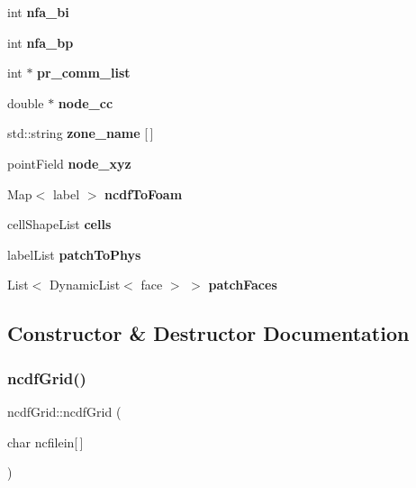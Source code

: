 \begin{DoxyCompactItemize}
int {\bfseries nfa\+\_\+bi}
\item 
\mbox{\label{classncdfGrid_af8c208eb375a16dbb611bfd3844ca87b}} 
int {\bfseries nfa\+\_\+bp}
\item 
\mbox{\label{classncdfGrid_a9969da386f4ce61acaba454946c8a0ed}} 
int $\ast$ {\bfseries pr\+\_\+comm\+\_\+list}
\item 
\mbox{\label{classncdfGrid_ac6123a7753a6bd65acddc55ce69386d5}} 
double $\ast$ {\bfseries node\+\_\+cc}
\item 
\mbox{\label{classncdfGrid_a20801c105799b394bb87c254700ed1ac}} 
std\+::string {\bfseries zone\+\_\+name} \mbox{[}$\,$\mbox{]}
\item 
\mbox{\label{classncdfGrid_ad86c7fc276892d574c33a711a1847f53}} 
point\+Field {\bfseries node\+\_\+xyz}
\item 
\mbox{\label{classncdfGrid_a009a31e5ffc429f7f328a5c6ab5a1f5a}} 
Map$<$ label $>$ {\bfseries ncdf\+To\+Foam}
\item 
\mbox{\label{classncdfGrid_a225ea15177c0956632504625bb047695}} 
cell\+Shape\+List {\bfseries cells}
\item 
\mbox{\label{classncdfGrid_a00bef3dec3224873739eb1246559e932}} 
label\+List {\bfseries patch\+To\+Phys}
\item 
\mbox{\label{classncdfGrid_a0db052391d2acdde9dfc7e076c812612}} 
List$<$ Dynamic\+List$<$ face $>$ $>$ {\bfseries patch\+Faces}
\end{DoxyCompactItemize}


\subsection{Constructor \& Destructor Documentation}
\mbox{\label{classncdfGrid_a4b9acf50933fce83cce51b4a5fdd8e38}} 
\subsubsection{\texorpdfstring{ncdf\+Grid()}{ncdfGrid()}}
{\footnotesize\ttfamily ncdf\+Grid\+::ncdf\+Grid (\begin{DoxyParamCaption}\item[{char}]{ncfilein\mbox{[}$\,$\mbox{]} }\end{DoxyParamCaption})\hspace{0.3cm}{\ttfamily [inline]}}



